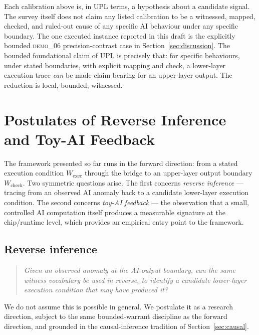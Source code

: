 \documentclass[11pt, a4paper]{article}
\theoremstyle{upldef}
\newcommand{\witness}[1]{\ensuremath{W_{\text{#1}}}}
\begin{document}
\medskip

Each calibration above is, in UPL terms, a hypothesis about a
candidate signal. The survey itself does not claim any listed
calibration to be a witnessed, mapped, checked, and ruled-out cause
of any specific AI behaviour under any specific boundary. The one
executed instance reported in this draft is the explicitly bounded
\textsc{demo\_06} precision-contrast case in
Section~\ref{sec:discussion}. The bounded foundational claim of UPL
\citep{hooker2020, sculley2015} is precisely that: for specific
behaviours, under stated boundaries, with explicit mapping and
check, a lower-layer execution trace \emph{can} be made
claim-bearing for an upper-layer output. The reduction is local,
bounded, witnessed.

\section{Postulates of Reverse Inference and Toy-AI Feedback}
\label{sec:reverse}

The framework presented so far runs in the forward direction: from a
stated execution condition $\witness{exec}$ through the bridge to an
upper-layer output boundary $\witness{check}$. Two symmetric
questions arise. The first concerns \emph{reverse inference} ---
tracing from an observed AI anomaly back to a candidate lower-layer
execution condition. The second concerns \emph{toy-AI feedback} ---
the observation that a small, controlled AI computation itself
produces a measurable signature at the chip/runtime level, which
provides an empirical entry point to the framework.

\subsection{Reverse inference}

\begin{quote}\itshape
Given an observed anomaly at the AI-output boundary, can the same
witness vocabulary be used in reverse, to identify a candidate
lower-layer execution condition that may have produced it?
\end{quote}

We do not assume this is possible in general. We postulate it as a
research direction, subject to the same bounded-warrant discipline
as the forward direction, and grounded in the causal-inference
tradition of Section~\ref{sec:causal}.
\end{document}
